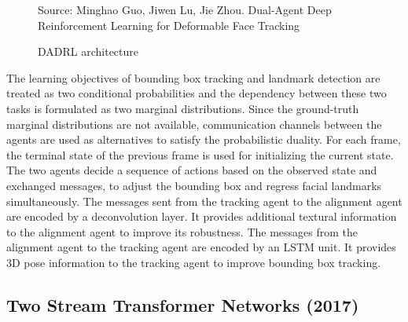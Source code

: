 \documentclass{llncs}
\begin{document}
\begin{figure}
%
{Source: Minghao Guo, Jiwen Lu, Jie Zhou. Dual-Agent Deep Reinforcement Learning for Deformable Face Tracking}
\caption{DADRL architecture}
\label{dadrl_architecture}
\end{figure}

The learning objectives of bounding box tracking and landmark detection are treated as two conditional probabilities and the dependency between these two tasks is formulated as two marginal distributions. Since the ground-truth marginal distributions are not available, communication channels between the agents are used as alternatives to satisfy the probabilistic duality. For each frame, the terminal state of the previous frame is used for initializing the current state. The two agents decide a sequence of actions based on the observed state and exchanged messages, to adjust the bounding box and regress facial landmarks simultaneously. The messages sent from the tracking agent to the alignment agent are encoded by a deconvolution layer. It provides additional textural information to the alignment agent to improve its robustness. The messages from the alignment agent to the tracking agent are encoded by an LSTM unit. It provides 3D pose information to the tracking agent to improve bounding box tracking.\\


\subsection{Two Stream Transformer Networks (2017) \cite{tstn}}
\end{document}
